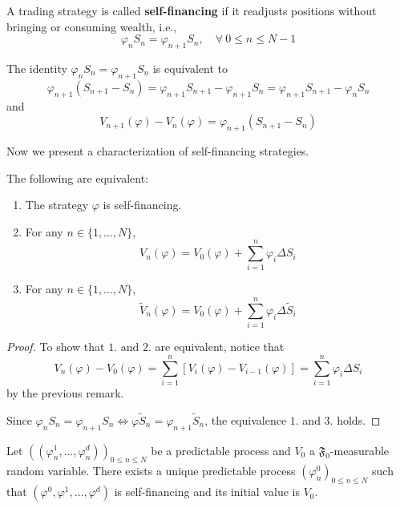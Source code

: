 \begin{definition}
    A trading strategy is called \textbf{self-financing} if it readjusts positions without bringing or consuming wealth, i.e., 
    \[
        \varphi_n S_n = \varphi_{n+1} S_n, \quad \forall~ 0 \leq n \le N-1
    \]
\end{definition}

\begin{remark}
    The identity $\varphi_n S_n = \varphi_{n+1} S_n$ is equivalent to
    \[
        \varphi_{n+1}(S_{n+1} - S_n) = \varphi_{n+1} S_{n+1} - \varphi_{n+1}S_n = \varphi_{n+1}S_{n+1} - \varphi_n S_n
    \]
    and
    \[
        V_{n+1}(\varphi) - V_n(\varphi) = \varphi_{n+1} (S_{n+1} - S_n)
    \]
\end{remark}

Now we present a characterization of self-financing strategies.

\begin{proposition}\label{prop:1.1.2}
    The following are equivalent:
    \begin{enumerate}
        \item The strategy $\varphi$ is self-financing. 
        \item For any $n \in \{ 1, \ldots, N \}$,
        \[
            V_n(\varphi) = V_0(\varphi) + \sum_{i=1}^{n} \varphi_i \Delta S_i
        \]
        \item For any $n \in \{ 1, \ldots, N \}$,
        \[
            \tilde{V}_n(\varphi) = V_0(\varphi) + \sum_{i=1}^{n} \varphi_i \Delta \tilde{S}_i
        \]
    \end{enumerate}
\end{proposition}

\begin{proof}
    To show that $1.$ and $2.$ are equivalent, notice that 
    \[
        V_n(\varphi) - V_0(\varphi) = \sum_{i=1}^{n}[V_i(\varphi) - V_{i-1}(\varphi)] = \sum_{i=1}^{n} \varphi_i \Delta S_i
    \] 
    by the previous remark. 

    Since $\varphi_n S_n = \varphi_{n+1} S_n \iff \varphi \tilde{S}_n = \varphi_{n+1} \tilde{S}_n$, the equivalence $1.$ and $3.$ holds.
\end{proof}

\begin{proposition}\label{prop:1.1.3}
    Let $((\varphi_n^1, \ldots, \varphi_n^d))_{0 \leq n \leq N}$ be a predictable process and $V_0$ a $\mathfrak{F}_0$-measurable random variable. There exists a unique predictable process $(\varphi_n^0)_{0 \leq n \leq N}$ such that $(\varphi^0, \varphi^1, \ldots, \varphi^d)$ is self-financing and its initial value is $V_0$.
\end{proposition}

